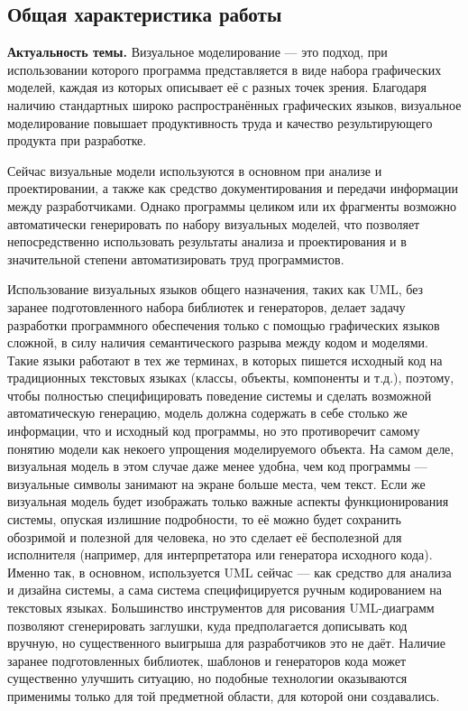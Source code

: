 \subsection*{\Large Общая характеристика работы}
\fontsize{14pt}{15pt}\selectfont
\textbf{Актуальность темы.}
Визуальное моделирование --- это подход, при использовании которого программа представляется 
в виде набора графических моделей, каждая из которых описывает её с разных точек 
зрения. Благодаря наличию стандартных широко распространённых графических языков, 
визуальное моделирование повышает продуктивность труда и качество результирующего 
продукта при разработке.

Сейчас визуальные модели используются в основном при анализе и проектировании, 
а также как средство документирования и передачи информации между 
разработчиками. Однако программы целиком или их фрагменты возможно 
автоматически генерировать по набору визуальных моделей, что позволяет 
непосредственно использовать результаты анализа и проектирования и в 
значительной степени автоматизировать труд программистов. 

Использование визуальных языков общего назначения, таких как UML, без заранее 
подготовленного набора библиотек и генераторов, делает задачу разработки 
программного обеспечения только с помощью графических языков сложной, 
в силу наличия семантического разрыва между кодом и моделями. Такие языки работают в 
тех же терминах, в которых пишется исходный код на традиционных текстовых языках 
(классы, объекты, компоненты и т.д.), поэтому, чтобы полностью специфицировать 
поведение системы и сделать возможной автоматическую генерацию, модель должна 
содержать в себе столько же информации, что и исходный код программы, но это 
противоречит самому понятию модели как некоего упрощения моделируемого объекта. 
На самом деле, визуальная модель в этом случае даже менее удобна, чем код 
программы --- визуальные символы занимают на экране больше места, чем текст. 
Если же визуальная модель будет изображать только важные аспекты 
функционирования системы, опуская излишние подробности, то её можно будет 
сохранить обозримой и полезной для человека, но это сделает её бесполезной для 
исполнителя (например, для интерпретатора или генератора исходного кода). 
Именно так, в основном, используется UML сейчас --- как средство для анализа и 
дизайна системы, а сама система специфицируется ручным кодированием на текстовых 
языках. Большинство инструментов для рисования UML-диаграмм позволяют 
сгенерировать заглушки, куда предполагается дописывать код вручную, но 
существенного выигрыша для разработчиков это не даёт. Наличие заранее подготовленных 
библиотек, шаблонов и генераторов кода может существенно улучшить ситуацию, но подобные 
технологии оказываются применимы только для той предметной области, для которой они создавались.

